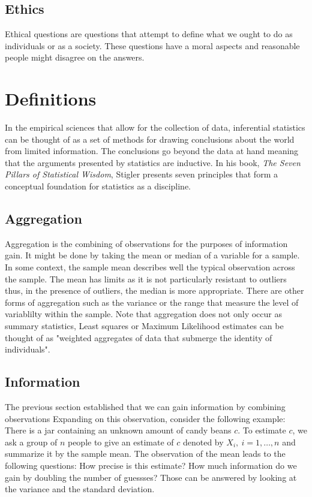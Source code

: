 \documentclass{article}
\begin{document}
\subsection{Ethics}
Ethical questions are questions that attempt to define what we ought to do as individuals or as a society.
These questions have a moral aspects and reasonable people might disagree on the answers.

\section{Definitions}
In the empirical sciences that allow for the collection of data, inferential statistics
can be thought of as a set of methods for drawing conclusions about the world
from limited information. The conclusions go beyond the data at hand meaning that
the arguments presented by statistics are inductive. In his book,
\textit{The Seven Pillars of Statistical Wisdom}, Stigler presents seven principles
that form a conceptual foundation for statistics as a discipline.

\subsection{Aggregation}
Aggregation is the combining of observations for the purposes of information gain.
It might be done by taking the mean or median of a variable for a sample. In some
context, the sample mean describes well the typical observation across the sample.
The mean has limits as it is not particularly resistant to outliers thus, in the
presence of outliers, the median is more appropriate. There are other forms of
aggregation such as the variance or the range that measure the level of
variablilty within the sample. Note that aggregation does not only occur as
summary statistics, Least squares or Maximum Likelihood estimates can be thought
of as "weighted aggregates of data that submerge the identity of individuals".

\subsection{Information}
The previous section established that we can gain information by combining observations
Expanding on this observation, consider the following example: There is a jar
containing an unknown amount of candy beans $c$. To estimate $c$, we ask a group
of $n$ people to give an estimate of $c$ denoted by $X_{i}, \ i = 1, \dots, n$
and summarize it by the sample mean. The observation of the mean leads to the
following questions: How precise is this estimate? How much information do we gain
by doubling the number of guessses? Those can be answered by looking at the variance
and the standard deviation.
\end{document}
